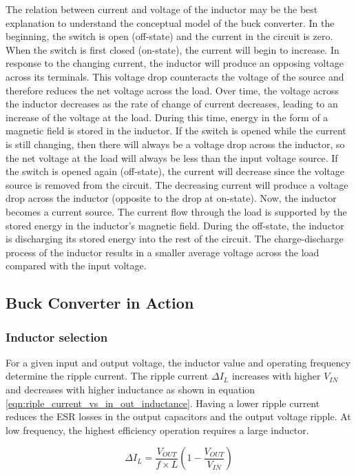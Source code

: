 \documentclass[\main/thesis.tex]{subfiles}
\begin{document}
The relation between current and voltage of the inductor may be the best explanation to understand the conceptual model of the buck converter. In the beginning, the switch is open (off-state) and the current in the circuit is zero. When the switch is first closed (on-state), the current will begin to increase. In response to the changing current, the inductor will produce an opposing voltage across its terminals. This voltage drop counteracts the voltage of the source and therefore reduces the net voltage across the load. Over time, the voltage across the inductor decreases as the rate of change of current decreases, leading to an increase of the voltage at the load. During this time, energy in the form of a magnetic field is stored in the inductor. If the switch is opened while the current is still changing, then there will always be a voltage drop across the inductor, so the net voltage at the load will always be less than the input voltage source. If the switch is opened again (off-state), the current will decrease since the voltage source is removed from the circuit. The decreasing current will produce a voltage drop across the inductor (opposite to the drop at on-state). Now, the inductor becomes a current source. The current flow through the load is supported by the stored energy in the inductor's magnetic field. During the off-state, the inductor is discharging its stored energy into the rest of the circuit. The charge-discharge process of the inductor results in a smaller average voltage across the load compared with the input voltage.

\subsection{Buck Converter in Action}

\subsubsection{Inductor selection}
For a given input and output voltage, the inductor value
and operating frequency determine the ripple current. The
ripple current $\Delta I_{L}$ increases with higher $V_{IN}$ and decreases with higher inductance as shown in equation \ref{eqn:riple_current_vs_in_out_inductance}.
Having a lower ripple current reduces the ESR losses in
the output capacitors and the output voltage ripple. At low frequency, the highest efficiency operation requires a large inductor.

\begin{equation}
    \Delta I_{L} = \frac{V_{OUT}}{f\times L} \left(1 - \frac{V_{OUT}}{V_{IN}}\right)
    \label{eqn:riple_current_vs_in_out_inductance}
\end{equation}
\end{document}
